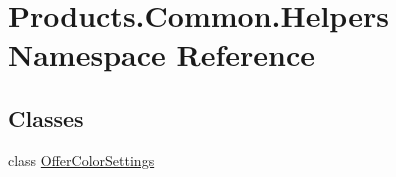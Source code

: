 \hypertarget{namespace_products_1_1_common_1_1_helpers}{}\section{Products.\+Common.\+Helpers Namespace Reference}
\label{namespace_products_1_1_common_1_1_helpers}
\subsection*{Classes}
\begin{DoxyCompactItemize}
\item 
class \hyperlink{class_products_1_1_common_1_1_helpers_1_1_offer_color_settings}{Offer\+Color\+Settings}
\end{DoxyCompactItemize}
